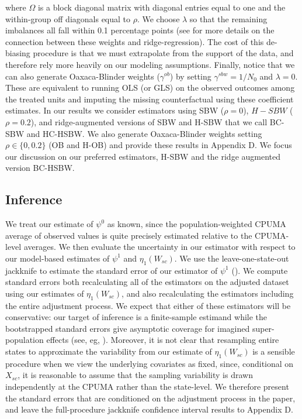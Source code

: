 \documentclass[12pt]{article}
\begin{document}
where $\Omega$ is a block diagonal matrix with diagonal entries equal to one and the within-group off diagonals equal to $\rho$. We choose $\lambda$ so that the remaining imbalances all fall within 0.1 percentage points (see \cite{ben2018augmented} for more details on the connection between these weights and ridge-regression). The cost of this de-biasing procedure is that we must extrapolate from the support of the data, and therefore rely more heavily on our modeling assumptions. Finally, notice that we can also generate Oaxaca-Blinder weights ($\gamma^{ob}$) by setting $\gamma^{sbw} = 1/N_0$ and $\lambda = 0$. These are equivalent to running OLS (or GLS) on the observed outcomes among the treated units and imputing the missing counterfactual using these coefficient estimates. In our results we consider estimators using SBW ($\rho = 0$), $H-SBW$ ($\rho = 0.2$), and ridge-augmented versions of SBW and H-SBW that we call BC-SBW and HC-HSBW. We also generate Oaxaca-Blinder weights setting $\rho \in \{0, 0.2\}$ (OB and H-OB) and provide these results in Appendix D. We focus our discussion on our preferred estimators, H-SBW and the ridge augmented version BC-HSBW. 

\subsection{Inference}

We treat our estimate of $\psi^0$ as known, since the population-weighted CPUMA average of observed values is quite precisely estimated relative to the CPUMA-level averages. We then evaluate the uncertainty in our estimator with respect to our model-based estimates of $\psi^1$ and $\eta_1(W_{sc})$. We use the leave-one-state-out jackknife to estimate the standard error of our estimator of $\psi^1$ (\cite{cameron2015practitioner}). We compute standard errors both recalculating all of the estimators on the adjusted dataset using our estimates of $\eta_1(W_{sc})$, and also recalculating the estimators including the entire adjustment process. We expect that either of these estimators will be conservative: our target of inference is a finite-sample estimand while the bootstrapped standard errors give asymptotic coverage for imagined super-population effects (see, eg, \cite{imbens2015causal}). Moreover, it is not clear that resampling entire states to approximate the variability from our estimate of $\eta_1(W_{sc})$ is a sensible procedure when we view the underlying covariates as fixed, since, conditional on $X_{sc}$, it is reasonable to assume that the sampling variability is drawn independently at the CPUMA rather than the state-level. We therefore present the standard errors that are conditioned on the adjustment process in the paper, and leave the full-procedure jackknife confidence interval results to Appendix D. 
\end{document}
